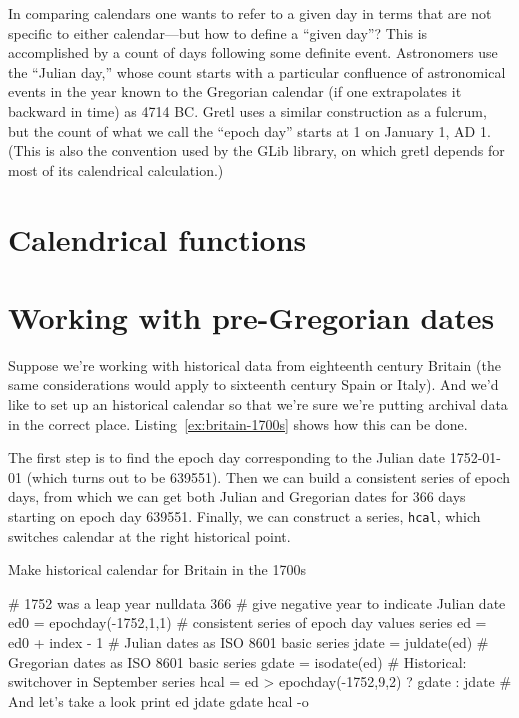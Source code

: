 In comparing calendars one wants to refer to a given day in terms that
are not specific to either calendar---but how to define a ``given
day''? This is accomplished by a count of days following some definite
event. Astronomers use the ``Julian day,'' whose count starts with a
particular confluence of astronomical events in the year known to the
Gregorian calendar (if one extrapolates it backward in time) as 4714
BC. Gretl uses a similar construction as a fulcrum, but the count of
what we call the ``epoch day'' starts at 1 on January 1, AD 1.  (This
is also the convention used by the \textsf{GLib} library, on which
gretl depends for most of its calendrical calculation.)

\section{Calendrical functions}
\label{cal-functions}

\section{Working with pre-Gregorian dates}
\label{cal-conversion}

Suppose we're working with historical data from eighteenth century
Britain (the same considerations would apply to sixteenth century
Spain or Italy). And we'd like to set up an historical calendar so
that we're sure we're putting archival data in the correct place.
Listing~\ref{ex:britain-1700s} shows how this can be done.

The first step is to find the epoch day corresponding to the Julian
date 1752-01-01 (which turns out to be 639551). Then we can build a
consistent series of epoch days, from which we can get both Julian and
Gregorian dates for 366 days starting on epoch day 639551. Finally, we
can construct a series, \texttt{hcal}, which switches calendar at the
right historical point.


\begin{script}[htbp]
  \caption{Make historical calendar for Britain in the 1700s}
  \label{ex:britain-1700s}
\begin{scode}
# 1752 was a leap year
nulldata 366
# give negative year to indicate Julian date
ed0 = epochday(-1752,1,1)
# consistent series of epoch day values
series ed = ed0 + index - 1
# Julian dates as ISO 8601 basic
series jdate = juldate(ed)
# Gregorian dates as ISO 8601 basic
series gdate = isodate(ed)
# Historical: switchover in September
series hcal = ed > epochday(-1752,9,2) ? gdate : jdate
# And let's take a look
print ed jdate gdate hcal -o
\end{scode}
\end{script}

